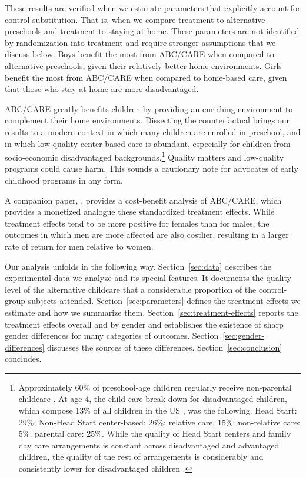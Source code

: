 These results are verified when we estimate parameters that explicitly account for control substitution. That is, when we compare treatment to alternative preschools and treatment to staying at home. These parameters are not identified by randomization into treatment and require stronger assumptions that we discuss below. Boys benefit the most from ABC/CARE when compared to alternative preschools, given their relatively better home environments. Girls benefit the most from ABC/CARE when compared to home-based care, given that those who stay at home are more disadvantaged. 

ABC/CARE greatly benefits children by providing an enriching environment to complement their home environments.  Dissecting the counterfactual brings our results to a modern context in which many children are enrolled in preschool, and in which low-quality center-based care is abundant, especially for children from socio-economic disadvantaged backgrounds.\footnote{Approximately 60\% of preschool-age children regularly receive non-parental childcare \citep{FIFCFS_2009_Wellbeing_REPORT}. At age 4, the child care break down for disadvantaged children, which compose 13\% of all children in the US \citep{USCB_2014_CoverageReport}, was the following. Head Start: 29\%; Non-Head Start center-based: 26\%; relative care: 15\%; non-relative care: 5\%; parental care: 25\%. While the quality of Head Start centers and family day care arrangements is constant across disadvantaged and advantaged children, the quality of the rest of arrangements is considerably and consistently lower for disadvantaged children \citep{FIFCFS_2009_Wellbeing_REPORT}.} Quality matters and low-quality programs could cause harm. This sounds a cautionary note for advocates of early childhood programs in any form.

A companion paper, \citet{Garcia_Heckman_Leaf_etal_2017_Comp_CBA_Unpublished}, provides a cost-benefit analysis of ABC/CARE, which provides a monetized analogue these standardized treatment effects. While treatment effects tend to be more positive for females than for males, the outcomes in which men are more affected are also costlier, resulting in a larger rate of return for men relative to women. 

Our analysis unfolds in the following way. Section~\ref{sec:data} describes the experimental data we analyze and its special features. It documents the quality level of the alternative childcare that a considerable proportion of the control-group subjects attended. Section~\ref{sec:parameters} defines the treatment effects we estimate and how we summarize them. Section~\ref{sec:treatment-effects} reports the treatment effects overall and by gender and establishes the existence of sharp gender differences for many categories of outcomes. Section~\ref{sec:gender-differences} discusses the sources of these differences. Section~\ref{sec:conclusion} concludes.

